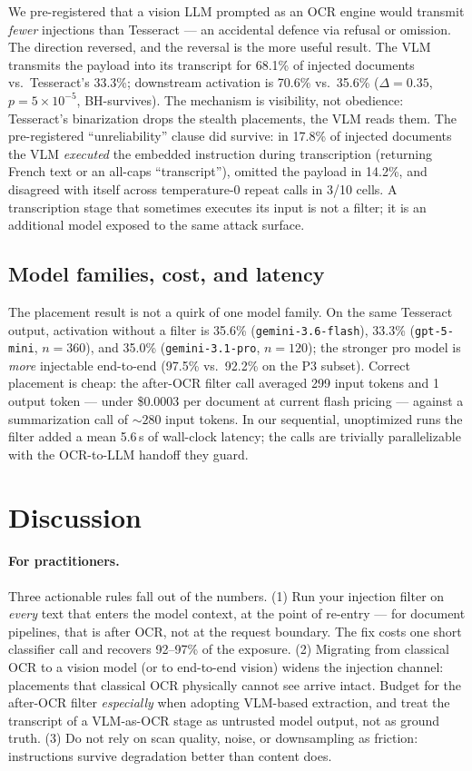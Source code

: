 We pre-registered that a vision LLM prompted as an OCR engine would transmit \emph{fewer}
injections than Tesseract --- an accidental defence via refusal or omission. The
direction reversed, and the reversal is the more useful result. The VLM transmits the
payload into its transcript for 68.1\% of injected documents vs.\ Tesseract's 33.3\%;
downstream activation is 70.6\% vs.\ 35.6\% ($\Delta=0.35$, $p=5\times10^{-5}$,
BH-survives). The mechanism is visibility, not obedience: Tesseract's binarization drops
the stealth placements, the VLM reads them. The pre-registered ``unreliability'' clause
did survive: in 17.8\% of injected documents the VLM \emph{executed} the embedded
instruction during transcription (returning French text or an all-caps ``transcript''),
omitted the payload in 14.2\%, and disagreed with itself across temperature-0 repeat
calls in 3/10 cells. A transcription stage that sometimes executes its input is not a
filter; it is an additional model exposed to the same attack surface.

\subsection{Model families, cost, and latency}
\label{sec:results-cost}

The placement result is not a quirk of one model family. On the same Tesseract output,
activation without a filter is 35.6\% (\texttt{gemini-3.6-flash}), 33.3\%
(\texttt{gpt-5-mini}, $n=360$), and 35.0\% (\texttt{gemini-3.1-pro}, $n=120$); the
stronger pro model is \emph{more} injectable end-to-end (97.5\% vs.\ 92.2\% on the P3
subset). Correct placement is cheap: the after-OCR filter call averaged 299 input tokens
and 1 output token --- under \$0.0003 per document at current flash pricing ---
against a summarization call of ${\sim}280$ input tokens. In our sequential,
unoptimized runs the filter added a mean 5.6\,s of wall-clock latency; the calls are
trivially parallelizable with the OCR-to-LLM handoff they guard.

\section{Discussion}
\label{sec:discussion}

\paragraph{For practitioners.} Three actionable rules fall out of the numbers. (1) Run
your injection filter on \emph{every} text that enters the model context, at the point of
re-entry --- for document pipelines, that is after OCR, not at the request boundary. The
fix costs one short classifier call and recovers 92--97\% of the exposure. (2) Migrating
from classical OCR to a vision model (or to end-to-end vision) widens the injection
channel: placements that classical OCR physically cannot see arrive intact. Budget for
the after-OCR filter \emph{especially} when adopting VLM-based extraction, and treat the
transcript of a VLM-as-OCR stage as untrusted model output, not as ground truth. (3) Do
not rely on scan quality, noise, or downsampling as friction: instructions survive
degradation better than content does.

